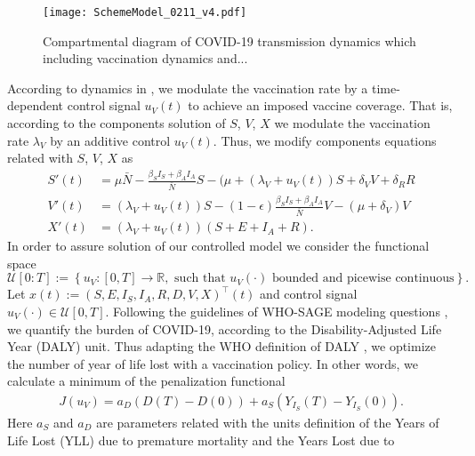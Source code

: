 \begin{figure}[h!]
    \centering
    \texttt{[image: SchemeModel\_0211\_v4.pdf]}
    \caption{Compartmental diagram of COVID-19 transmission dynamics which
    including vaccination dynamics and...}
    \label{Fig:SchemeModel_opt}
\end{figure}

According to dynamics in , we modulate the
vaccination rate by a time-dependent control signal $u_V(t)$ to
achieve an imposed vaccine coverage. That is, according to the components
solution of  $S$, $V$, $X$ we modulate the
vaccination rate $\lambda_V$ by an additive control $u_V(t)$. Thus, we modify
components equations related with $S$, $V$, $X$ as
\begin{equation}
    \label{eqn:counter}
    \begin{aligned}
        S'(t) & =
            \mu \bar{N} - \frac{\beta_S I_S + \beta_AI_A}{\bar{N}}S
            - (\mu + (\lambda_V + u_V(t)) S
            + \delta_V V + \delta_R R
        \\
        V'(t) &=
            (\lambda_V + u_V(t)) S-(1-\epsilon)
            \frac{\beta_S I_S + \beta_A I_A}{\bar{N}}V
            - (\mu+\delta_V) V
        \\
        X'(t) &=
            (\lambda_V + u_V(t)) (S + E + I_A + R).
    \end{aligned}
\end{equation}
In order to assure solution of our controlled model we
consider the functional space
$$
    \mathcal{U}[0:T]:=
    \left\{
        u_V: [0, T] \to \mathbb{R},
        \text{ such that $u_V(\cdot)$ bounded and picewise continuous}
    \right\}.
$$
Let ${x(t):= (S,E,I_S,I_A,R,D,V,X)^{\top}(t)}$
and control signal $u_V(\cdot)\in \mathcal{U}[0, T]$.
Following the guidelines of
WHO-SAGE modeling questions \cite{sage2020},
we quantify the burden of COVID-19, according
to the Disability-Adjusted Life Year (DALY) unit. Thus adapting the WHO
definition of DALY \cite{WhoDALY}, we optimize the number of year of life lost
with a vaccination policy. In other words, we calculate a minimum of
the penalization functional
\begin{align}
    \label{eqn:cost_functional}
    J(u_V) =
    a_D ( D(T) - D(0)) +
    a_S (Y_{I_S}(T) - Y_{I_S}(0)).
\end{align}
Here $a_S$ and $a_D$ are parameters related with the units definition of the
Years of Life Lost (YLL) due to premature mortality and the Years Lost due to

